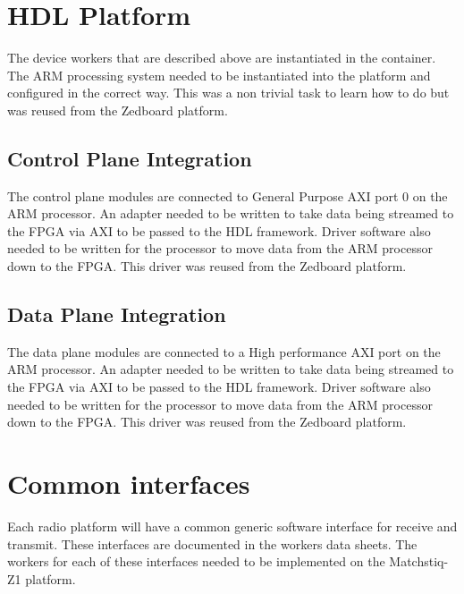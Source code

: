 \section{HDL Platform}
  The device workers that are described above are instantiated in the container.  The ARM processing system needed to be instantiated into the platform and configured in the correct way. This was a non trivial task to learn how to do but was reused from the Zedboard platform.

  \subsection{Control Plane Integration}
    The control plane modules are connected to General Purpose AXI port 0 on the ARM processor.  An adapter needed to be written to take data being streamed to the FPGA via AXI to be passed to the HDL framework.  Driver software also needed to be written for the processor to move data from the ARM processor down to the FPGA.  This driver was reused from the Zedboard platform.


  \subsection{Data Plane Integration}
    The data plane modules are connected to a High performance AXI port on the ARM processor.  An adapter needed to be written to take data being streamed to the FPGA via AXI to be passed to the HDL framework.  Driver software also needed to be written for the processor to move data from the ARM processor down to the FPGA.  This driver was reused from the Zedboard platform.

\section{Common interfaces}
  Each radio platform will have a common generic software interface for receive and transmit.  These interfaces are documented in the workers data sheets.  The workers for each of these interfaces needed to be implemented on the Matchstiq-Z1 platform.



